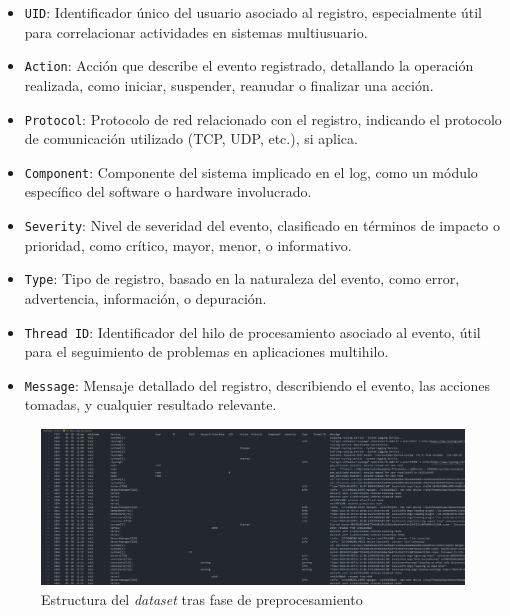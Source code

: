 \begin{itemize}
    \item \texttt{UID}: Identificador único del usuario asociado al registro, especialmente útil para correlacionar actividades en sistemas multiusuario. \\
    \item \texttt{Action}: Acción que describe el evento registrado, detallando la operación realizada, como iniciar, suspender, reanudar o finalizar una acción. \\
    \item \texttt{Protocol}: Protocolo de red relacionado con el registro, indicando el protocolo de comunicación utilizado (TCP, UDP, etc.), si aplica. \\
    \item \texttt{Component}: Componente del sistema implicado en el log, como un módulo específico del software o hardware involucrado. \\
    \item \texttt{Severity}: Nivel de severidad del evento, clasificado en términos de impacto o prioridad, como crítico, mayor, menor, o informativo. \\
    \item \texttt{Type}: Tipo de registro, basado en la naturaleza del evento, como error, advertencia, información, o depuración. \\
    \item \texttt{Thread ID}: Identificador del hilo de procesamiento asociado al evento, útil para el seguimiento de problemas en aplicaciones multihilo. \\
    \item \texttt{Message}: Mensaje detallado del registro, describiendo el evento, las acciones tomadas, y cualquier resultado relevante.
\end{itemize}

\begin{figure}[H]
    \centering
    \includegraphics[width=1\linewidth]{imagenes/dataset-preprocesado.png}
    \caption{Estructura del \textit{dataset} tras fase de preprocesamiento}
    \label{fig:dataset-preprocesado}
\end{figure}

